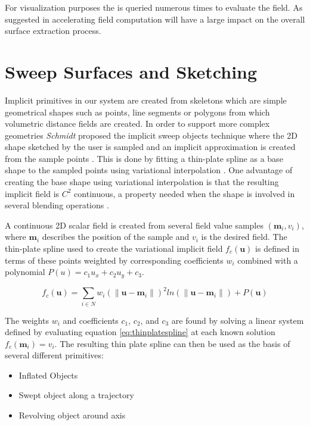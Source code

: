 For visualization purposes the \blob is queried numerous times to evaluate the field. As suggested in \cite{SWG2005} 
accelerating field computation will have a large impact on the overall surface extraction process. 

\section{Sweep Surfaces and Sketching}
Implicit primitives in our system are created from skeletons which are simple geometrical shapes such as points, line segments or 
polygons from which volumetric distance fields are created. In order to support more complex geometries \textit{Schmidt} \etal proposed the
implicit sweep objects technique where the 2D shape sketched by the user is sampled and an implicit approximation is created from 
the sample points \cite{Schmidtc}. This is done by fitting a thin-plate spline as a base shape to the sampled points using variational 
interpolation \cite{Turk1999}. One advantage of creating the base shape using variational interpolation is that the resulting implicit 
field is $C^2$ continuous, a property needed when the shape is involved in several blending operations \cite{barthe2004controllable}.

A continuous 2D scalar field is created from several field value samples $(\mathbf{m}_i, v_i)$, where $\mathbf{m}_i$ describes the 
position of the sample and $v_i$ is the desired field. The thin-plate spline used to create the variational 
implicit field $f_c(\mathbf{u})$ is defined in terms of these points weighted by corresponding coefficients $w_i$ combined with a polynomial 
$P(u) = c_1u_x +c_2u_y +c_3$.

\begin{equation}
f_c(\mathbf{u}) = \sum_{i \in N} w_i(\|\mathbf{u}-\mathbf{m}_i\|)^2ln(\|\mathbf{u}-\mathbf{m}_i\|)+P(\mathbf{u}) 
\label{eq:thinplatespline}
\end{equation}

The weights $w_i$ and coefficients $c_1$, $c_2$, and $c_3$ are found by solving a linear system defined by evaluating 
equation \ref{eq:thinplatespline} at each known solution $f_c(\mathbf{m}_i)=v_i$.
The resulting thin plate spline can then be used as the basis of several different primitives:

\begin{itemize}
 \item Inflated Objects
 \item Swept object along a trajectory
 \item Revolving object around axis
\end{itemize}

